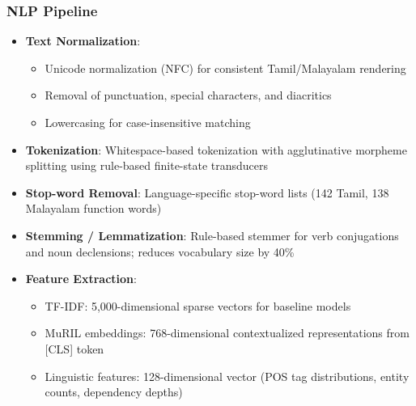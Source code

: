 \documentclass{beamer}
\begin{document}
\begin{frame}
\frametitle{NLP Pipeline}
\begin{itemize}
    \item \textbf{Text Normalization}:
    \begin{itemize}
        \item Unicode normalization (NFC) for consistent Tamil/Malayalam rendering
        \item Removal of punctuation, special characters, and diacritics
        \item Lowercasing for case-insensitive matching
    \end{itemize}
    \item \textbf{Tokenization}: Whitespace-based tokenization with agglutinative morpheme splitting using rule-based finite-state transducers
    \item \textbf{Stop-word Removal}: Language-specific stop-word lists (142 Tamil, 138 Malayalam function words)
    \item \textbf{Stemming / Lemmatization}: Rule-based stemmer for verb conjugations and noun declensions; reduces vocabulary size by 40\%
    \item \textbf{Feature Extraction}:
    \begin{itemize}
        \item TF-IDF: 5,000-dimensional sparse vectors for baseline models
        \item MuRIL embeddings: 768-dimensional contextualized representations from [CLS] token
        \item Linguistic features: 128-dimensional vector (POS tag distributions, entity counts, dependency depths)
    \end{itemize}
\end{itemize}
\end{frame}
\end{document}
